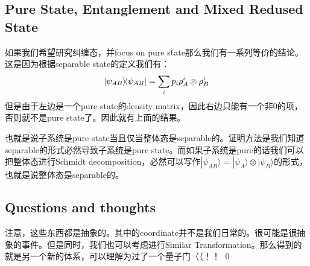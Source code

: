 \subsection{Pure State, Entanglement and Mixed Redused State}
如果我们希望研究纠缠态，并focus on pure state那么我们有一系列等价的结论。
这是因为根据separable state的定义我们有：
\begin{align}
  \left| \psi_{AB} \middle\rangle\!\middle\langle \psi_{AB} \right| = \sum_i p_i \rho_A^i \otimes \rho_B^i
\end{align}
但是由于左边是一个pure state的density matrix，因此右边只能有一个非0的项，否则就不是pure state了。因此就有上面的结果。

也就是说子系统是pure
state当且仅当整体态是separable的。证明方法是我们知道separable的形式必然导致子系统是pure
state。而如果子系统是pure的话我们可以把整体态进行Schmidt decomposition，必然可以写作$
|\psi_{AB}\rangle = |\psi_A\rangle \otimes
|\psi_B\rangle $的形式，也就是说整体态是separable的。

\subsection{Questions and thoughts}


注意，这些东西都是抽象的。其中的coordinate并不是我们日常的。很可能是很抽象的事件。但是同时，我们也可以考虑进行Similar
Transformation。那么得到的就是另一个新的体系，可以理解为过了一个量子门（（！！
\qed

